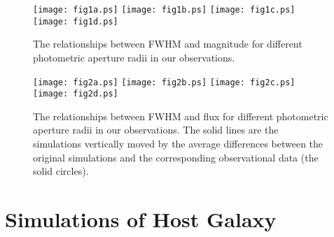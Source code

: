 \documentclass[structabstract]{raa}
\begin{document}
\begin{figure}
 \begin{center}
  \texttt{[image: fig1a.ps]}
  \texttt{[image: fig1b.ps]}
  \texttt{[image: fig1c.ps]}
  \texttt{[image: fig1d.ps]}
 \end{center}
 \caption{The relationships between FWHM and magnitude for different photometric aperture radii in our observations.}
  \label{fig1}
\end{figure}
\begin{figure}
 \begin{center}
  \texttt{[image: fig2a.ps]}
  \texttt{[image: fig2b.ps]}
  \texttt{[image: fig2c.ps]}
  \texttt{[image: fig2d.ps]}
 \end{center}
 \caption{The relationships between FWHM and flux for different photometric aperture radii in our observations.
  The solid lines are the simulations vertically moved by the average differences between the original simulations
  and the corresponding observational data (the solid circles).}
  \label{fig2}
\end{figure}

\section{Simulations of Host Galaxy}
\end{document}
